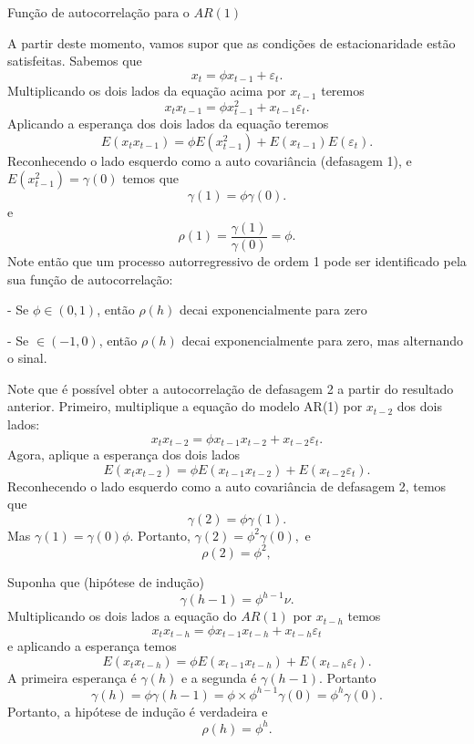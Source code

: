 \documentclass[
  letterpaper,
  DIV=11,
  numbers=noendperiod]{scrreprt}
\theoremstyle{definition}
\theoremstyle{plain}
\theoremstyle{definition}
\theoremstyle{plain}
\theoremstyle{remark}
\begin{document}
\begin{frame}{Função de autocorrelação para o $AR(1)$ }
    
    A partir deste momento, vamos supor que as condições de estacionaridade estão satisfeitas. Sabemos que
    $$x_{t}= \phi x_{t-1}+\varepsilon_t.$$
    Multiplicando os dois lados da equação acima por $x_{t-1}$ teremos
    $$x_{t}x_{t-1}= \phi x_{t-1}^2+x_{t-1}\varepsilon_t.$$
    Aplicando a esperança dos dois lados da equação teremos
    $$E(x_{t}x_{t-1})= \phi E(x_{t-1}^2)+E(x_{t-1})E(\varepsilon_t).$$
    Reconhecendo o lado esquerdo como a auto covariância (defasagem 1), e $E(x_{t-1}^2)=\gamma(0)$ temos que
    $$\gamma(1)= \phi \gamma(0).$$
    e 
    $$\rho(1)=\frac{\gamma(1)}{\gamma(0)}=\phi.$$
Note então que um processo autorregressivo de ordem 1 pode ser identificado pela sua função de autocorrelação:

- Se $\phi\in(0,1)$, então $\rho(h)$ decai exponencialmente para zero

- Se $\in(-1,0)$, então $\rho(h)$ decai exponencialmente para zero, mas alternando o sinal. 

\end{frame}

\begin{frame}   
    Note que é possível obter a autocorrelação de defasagem 2 a partir do resultado  anterior. Primeiro, multiplique a
    equação do modelo AR(1) por $x_{t-2}$ dos dois lados:
        $$x_{t}x_{t-2}= \phi x_{t-1}x_{t-2} + x_{t-2}\varepsilon_t.$$
    Agora, aplique a esperança dos dois lados   
    $$E(x_{t}x_{t-2})= \phi E(x_{t-1}x_{t-2}) + E(x_{t-2}\varepsilon_t).$$
    Reconhecendo o lado esquerdo como a auto covariância de defasagem 2, temos que
    $$\gamma(2)= \phi \gamma(1).$$
    Mas $\gamma(1)=\gamma(0)\phi$. Portanto,
    $\gamma(2)= \phi^2 \gamma(0),$
    e
    $$\rho(2)= \phi^2,$$
\end{frame}

\begin{frame}
    Suponha que (hipótese de indução)
    $$\gamma(h-1)=\phi^{h-1}\nu.$$
    Multiplicando os dois lados a equação do $AR(1)$ por $x_{t-h}$ temos
    $$x_t x_{t-h}= \phi x_{t-1}x_{t-h} + x_{t-h}\varepsilon_t$$
    e aplicando a esperança temos
    $$E(x_t x_{t-h})= \phi E(x_{t-1}x_{t-h}) + E(x_{t-h}\varepsilon_t).$$
    A primeira esperança é $\gamma(h)$ e a segunda é $\gamma(h-1)$. Portanto
    $$\gamma(h)=\phi\gamma(h-1)=\phi\times \phi^{h-1} \gamma(0) = \phi^h \gamma(0).$$
    Portanto, a hipótese de indução é verdadeira e
    $$\rho(h)=\phi^h.$$
\end{frame}
\end{document}
